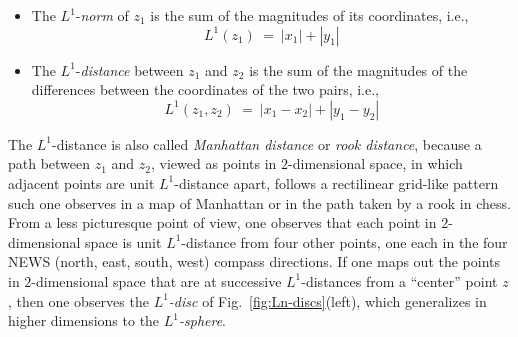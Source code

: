 \begin{itemize}
\item
The $L^1$-{\it norm} of $z_1$ is the sum of the magnitudes of its coordinates, i.e.,
\[ L^1(z_1) \ = \ |x_1| + |y_1|  \]  

\medskip\item
The $L^1$-{\it distance} between $z_1$ and $z_2$ is the sum of the magnitudes of the differences between the coordinates of the two pairs, i.e.,
\[ L^1(z_1, z_2) \ = \ |x_1 - x_2| + |y_1 - y_2| \]
\end{itemize}
The $L^1$-distance is also called {\it Manhattan distance} or {\it rook distance}, because a path between $z_1$ and $z_2$, viewed as points in $2$-dimensional space, in which adjacent points are unit $L^1$-distance apart, follows a rectilinear grid-like pattern such one observes in a map of Manhattan or in the path taken by a rook in chess.  From a less picturesque point of view, one observes that each point in $2$-dimensional space is unit $L^1$-distance from four other points, one each in the four NEWS (north, east, south, west) compass directions.  If one maps out the points in $2$-dimensional space that are at successive $L^1$-distances from a ``center'' point $z$, then one observes the {\it $L^1$-disc} of Fig.~\ref{fig:Ln-discs}(left), which generalizes in higher dimensions to the {\it $L^1$-sphere}.  
